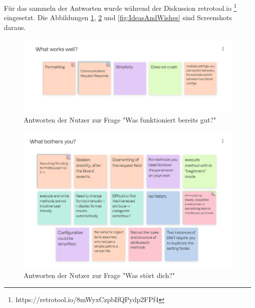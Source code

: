 Für das sammeln der Antworten wurde während der Diskussion retrotool.io \footnote{https://retrotool.io/8mWyxCzpbIfQPydp2FPf4} eingesetzt.
Die Abbildungen \ref{fig:WhatWorksWell}, \ref{fig:WhatBothersYou} und \ref{fig:IdeasAndWishes} sind Screenshots daraus.


\begin{figure}[H]
   \centering
   \includegraphics[width=1.0\textwidth]{gfx/S1_RetroBoard_WhatWorksWell.png}
   \caption{
       Antworten der Nutzer zur Frage "Was funktioniert bereits gut?"
   }
   \label{fig:WhatWorksWell}
\end{figure}

\begin{figure}[H]
   \centering
   \includegraphics[width=1.0\textwidth]{gfx/S1_RetroBoard_WhatBothersYou.png}
   \caption{
       Antworten der Nutzer zur Frage "Was stört dich?"
   }
   \label{fig:WhatBothersYou}
\end{figure}

